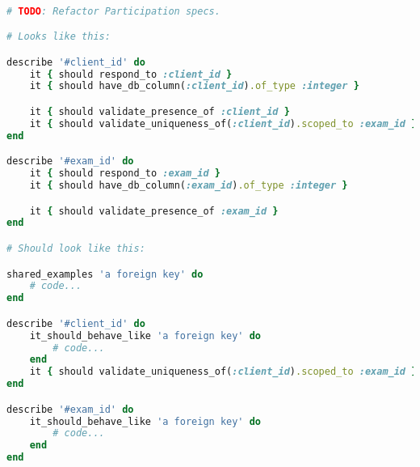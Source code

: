 \documentclass[]{minimal}
\begin{document}
\begin{lstlisting}[language=Ruby]

# TODO: Refactor Participation specs.

# Looks like this:

describe '#client_id' do
    it { should respond_to :client_id }
    it { should have_db_column(:client_id).of_type :integer }

    it { should validate_presence_of :client_id }
    it { should validate_uniqueness_of(:client_id).scoped_to :exam_id }
end

describe '#exam_id' do
    it { should respond_to :exam_id }
    it { should have_db_column(:exam_id).of_type :integer }

    it { should validate_presence_of :exam_id }
end

# Should look like this:

shared_examples 'a foreign key' do
    # code...
end

describe '#client_id' do
    it_should_behave_like 'a foreign key' do
        # code...
    end
    it { should validate_uniqueness_of(:client_id).scoped_to :exam_id }
end

describe '#exam_id' do
    it_should_behave_like 'a foreign key' do
        # code...
    end
end

\end{lstlisting}
\end{document}
